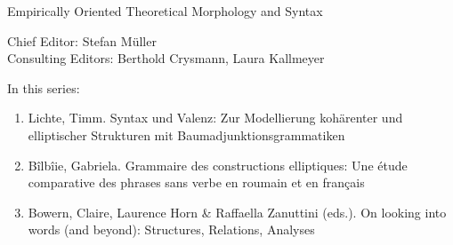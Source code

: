 {\large Em­pir­i­cal­ly Ori­ent­ed The­o­ret­i­cal Mor­phol­o­gy and Syn­tax}

\bigskip

Chief Editor: Stefan Müller \\
Consulting Editors: Berthold Crysmann, Laura Kallmeyer

\bigskip

In this series:

\begin{enumerate}
\item Lichte, Timm. Syntax und Valenz: Zur Modellierung kohärenter und elliptischer Strukturen mit Baumadjunktionsgrammatiken
\item Bîlbîie, Gabriela. Grammaire des constructions elliptiques: Une étude comparative des phrases sans verbe en roumain et en français 
\item Bowern, Claire, Laurence Horn \& Raffaella Zanuttini (eds.). On looking into words (and beyond): Structures, Relations, Analyses
 
\end{enumerate}



